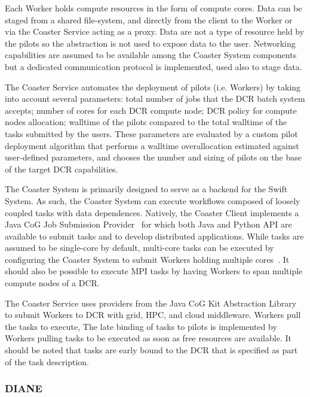 \documentclass{sig-alternate}
\begin{document}

Each Worker holds compute resources in the form of compute cores. Data can be
staged from a shared file-system, and directly from the client to the Worker or
via the Coaster Service acting as a proxy. Data are not a type of resource held
by the pilots so the \pilot abstraction is not used to expose data to the user.
Networking capabilities are assumed to be available among the Coaster System
components but a dedicated communication protocol is implemented, used also to
stage data.

The Coaster Service automates the deployment of pilots (i.e. Workers) by taking
into account several parameters: total number of jobs that the DCR batch system
accepts; number of cores for each DCR compute node; DCR policy for compute nodes
allocation; walltime of the pilots compared to the total walltime of the tasks
submitted by the users. These parameters are evaluated by a custom pilot
deployment algorithm that performs a walltime overallocation estimated against
user-defined parameters, and chooses the number and sizing of pilots on the base
of the target DCR capabilities.

The Coaster System is primarily designed to serve as a \pilot backend for the
Swift System. As such, the Coaster System can execute workflows composed of
loosely coupled tasks with data dependences. Natively, the Coaster Client
implements a Java CoG Job Submission Provider~\cite{von2000cog,cog_url} for
which both Java and Python API are available to submit tasks and to develop
distributed applications. While tasks are assumed to be single-core by default,
multi-core tasks can be executed by configuring the Coaster System to submit
Workers holding multiple cores~\cite{swift_guide_url}. It should also be
possible to execute MPI tasks by having Workers to span multiple compute nodes
of a DCR.

The Coaster Service uses providers from the Java CoG Kit Abstraction Library to
submit Workers to DCR with grid, HPC, and cloud middleware. Workers pull the
tasks to execute, The late binding of tasks to pilots is implemented by Workers
pulling tasks to be executed as soon as free resources are available. It should
be noted that tasks are early bound to the DCR that is specified as part of the
task description.

%
\subsubsection{DIANE}\label{sec:diane}
\end{document}
